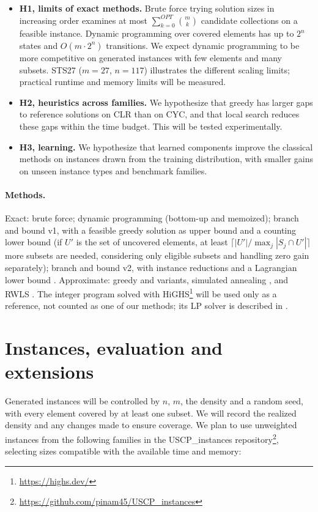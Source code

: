 \documentclass[a4paper,11pt]{article}
\begin{document}
\begin{itemize}
  \item \textbf{H1, limits of exact methods.} Brute force trying solution sizes in increasing order examines at most $\sum_{k=0}^{OPT} \binom{m}{k}$ candidate collections on a feasible instance. Dynamic programming over covered elements has up to $2^n$ states and $O(m \cdot 2^n)$ transitions. We expect dynamic programming to be more competitive on generated instances with few elements and many subsets. STS27 ($m = 27$, $n = 117$) illustrates the different scaling limits; practical runtime and memory limits will be measured.
  \item \textbf{H2, heuristics across families.} We hypothesize that greedy has larger gaps to reference solutions on CLR than on CYC, and that local search reduces these gaps within the time budget. This will be tested experimentally.
  \item \textbf{H3, learning.} We hypothesize that learned components improve the classical methods on instances drawn from the training distribution, with smaller gains on unseen instance types and benchmark families.
\end{itemize}

\paragraph{Methods.} Exact: brute force; dynamic programming (bottom-up and memoized); branch and bound v1, with a feasible greedy solution as upper bound and a counting lower bound (if $U'$ is the set of uncovered elements, at least $\lceil |U'| / \max_j |S_j \cap U'| \rceil$ more subsets are needed, considering only eligible subsets and handling zero gain separately); branch and bound v2, with instance reductions and a Lagrangian lower bound \cite{beasley1987}. Approximate: greedy \cite{chvatal1979} and variants, simulated annealing \cite{kirkpatrick1983}, and RWLS \cite{gao2015}. The integer program solved with HiGHS\footnote{\url{https://highs.dev/}} will be used only as a reference, not counted as one of our methods; its LP solver is described in \cite{huangfu2018}.

\section{Instances, evaluation and extensions}
\label{sec:instances}

Generated instances will be controlled by $n$, $m$, the density and a random seed, with every element covered by at least one subset. We will record the realized density and any changes made to ensure coverage. We plan to use unweighted instances from the following families in the USCP\_instances repository\footnote{\url{https://github.com/pinam45/USCP_instances}}, selecting sizes compatible with the available time and memory:
\end{document}
